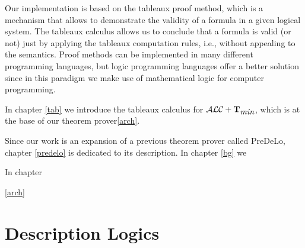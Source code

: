 \documentclass[a4paper, 11pt, oneside]{duthesis}
\newcommand{\tip}{{\bf T}}
\newcommand{\alctmin}{\mathcal{ALC}+\tip_{\mbox{\em min}}}
\begin{document}
%

Our implementation is based on the tableaux proof method, which is a mechanism that allows to demonstrate the validity of a formula in a given logical system.
The tableaux calculus allows us to conclude that a formula is valid (or not) just by applying the tableaux computation rules, i.e., without appealing to the semantics.
Proof methods can be implemented in many different programming languages, but logic programming languages offer a better solution since in this paradigm we make use of mathematical logic for computer programming.

In chapter \ref{tab} we introduce the tableaux calculus for $\alctmin$, which is at the base of our theorem prover\ref{arch}.

Since our work is an expansion of a previous theorem prover called PreDeLo, chapter \ref{predelo} is dedicated to its description. In chapter \ref{bg} we 

In chapter 


\ref{arch}\\



\newpage



\chapter{Description Logics}\label{dl}
\end{document}
